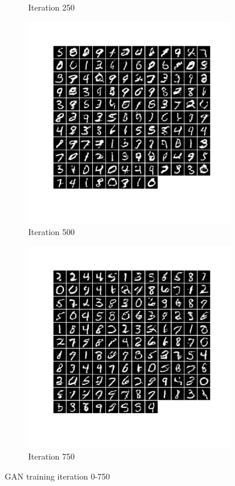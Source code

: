 \documentclass[12pt]{article}
\begin{document}
\begin{figure}[htbp]
\begin{subfigure}[t]{0.48\textwidth}
        \caption{Iteration 250}
    \label{hw3p4b}
    \end{subfigure}
    \begin{subfigure}[t]{0.48\textwidth}
        \centering
        \includegraphics[trim={3in 2in 3in 0in},scale=0.3]{./Homework3/output/gan/2.png}
        \caption{Iteration 500}
    \label{hw3p4c}
    \end{subfigure}
    \begin{subfigure}[t]{0.48\textwidth}
        \centering
        \includegraphics[trim={3in 2in 3in 0in},scale=0.3]{./Homework3/output/gan/3.png}
        \caption{Iteration 750}
    \label{hw3p4d}
    \end{subfigure}
    \caption{GAN training iteration 0-750}
\end{figure}
\end{document}
